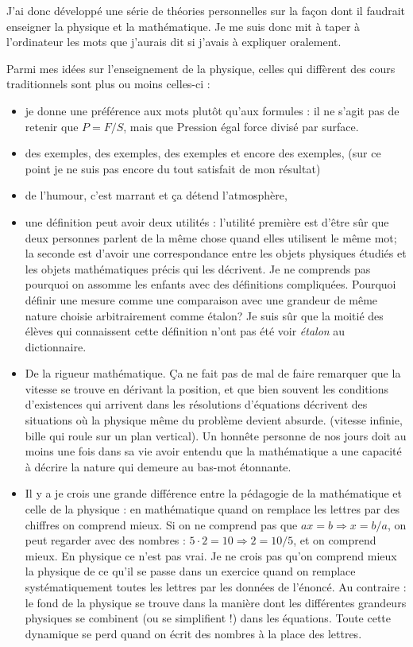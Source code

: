 J'ai donc développé une série de théories personnelles sur la façon dont il faudrait enseigner la physique et la mathématique. Je me suis donc mit à taper à l'ordinateur les mots que j'aurais dit si j'avais à expliquer oralement.

Parmi mes idées sur l'enseignement de la physique, celles qui diffèrent des cours \og traditionnels\fg{} sont plus ou moins celles-ci :
\begin{itemize}
\item je donne une préférence aux mots plutôt qu'aux formules : il ne s'agit pas de retenir que $P=F/S$, mais que \og Pression égal force divisé par surface\fg.
\item des exemples, des exemples, des exemples et encore des exemples, (sur ce point je ne suis pas encore du tout satisfait de mon résultat)
\item de l'humour, c'est marrant et ça détend l'atmosphère,
\item une définition peut avoir deux utilités : l'utilité première est d'être sûr que deux personnes parlent de la même chose quand elles utilisent le même mot; la seconde est d'avoir une correspondance entre les objets physiques étudiés et les objets mathématiques précis qui les décrivent. Je ne comprends pas pourquoi on assomme les enfants avec des définitions compliquées. Pourquoi définir une \og mesure\fg{} comme une \og comparaison avec une grandeur de même nature choisie arbitrairement comme étalon\fg ? Je suis sûr que la moitié des élèves qui connaissent cette définition n'ont pas été voir \emph{étalon} au dictionnaire.
\item De la rigueur mathématique. Ça ne fait pas de mal de faire remarquer que la vitesse se trouve en dérivant la position, et que bien souvent les conditions d'existences qui arrivent dans les résolutions d'équations décrivent des situations où la physique même du problème devient absurde. (vitesse infinie, bille qui roule sur un plan vertical). Un honnête personne de nos jours doit au moins une fois dans sa vie avoir entendu que la mathématique a une capacité à décrire la nature qui demeure au bas-mot étonnante.
\item Il y a je crois une grande différence entre la pédagogie de la mathématique et celle de la physique : en mathématique quand on remplace les lettres par des chiffres on comprend mieux. Si on ne comprend pas que $ax=b\Rightarrow x=b/a$, on peut regarder avec des nombres : $5\cdot 2=10\Rightarrow 2=10/5$, et on comprend mieux. En physique ce n'est pas vrai. Je ne crois pas qu'on comprend mieux la physique de ce qu'il se passe dans un exercice quand on remplace systématiquement toutes les lettres par les données de l'énoncé. Au contraire : le fond de la physique se trouve dans la manière dont les différentes grandeurs physiques se combinent (ou se simplifient !) dans les équations. Toute cette dynamique se perd quand on écrit des nombres à la place des lettres.

\end{itemize}
